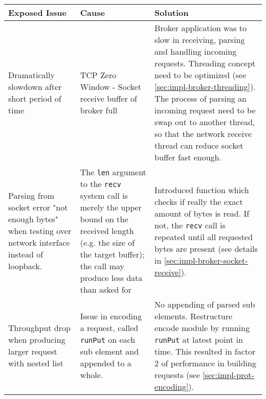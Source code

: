 \begin{table}[H]
\begin{tabular}{|p{4cm}|p{5cm}|p{6cm}|}
\hline
{\bf Exposed Issue}                                                                                  & {\bf Cause}                                                                                                                                                                                                                 & {\bf Solution}                                                                                                                                                                                                                                                                                    \\ \hline
Dramatically slowdown after short period of time                                                       & TCP Zero Window - Socket receive buffer of broker full                                                                                                                                                                      & Broker application was to slow in receiving, parsing and handling incoming requests. Threading concept need to be optimized (see \ref{sec:impl-broker-threading}). The process of parsing an incoming request need to be swap out to another thread, so that the network receive thread can reduce socket buffer fast enough. \\ \hline
Parsing from socket error "not enough bytes"  when testing over network
interface instead of loopback. & The \lstinline{len} argument to the
\lstinline{recv} system call is merely the upper bound on the received length
(e.g. the size of the target buffer); the call may produce less data than asked
for & Introduced function which checks if really the exact amount of bytes is
read. If not, the \lstinline{recv} call is repeated until all requested bytes are present (see details in \ref{sec:impl-broker-socket-receive}).                                                                                                                                              \\ \hline
Throughput drop when producing larger request with nested list
& Issue in encoding a request, called \lstinline{runPut} on each sub element and
appended to a whole.
& No appending of parsed sub elements. Restructure encode module by running
\lstinline{runPut} at latest point in time. This resulted in factor 2 of performance in building requests (see \ref{sec:impl-prot-encoding}).                                                                                                                                      \\ \hline

\end{tabular}
\end{table}
